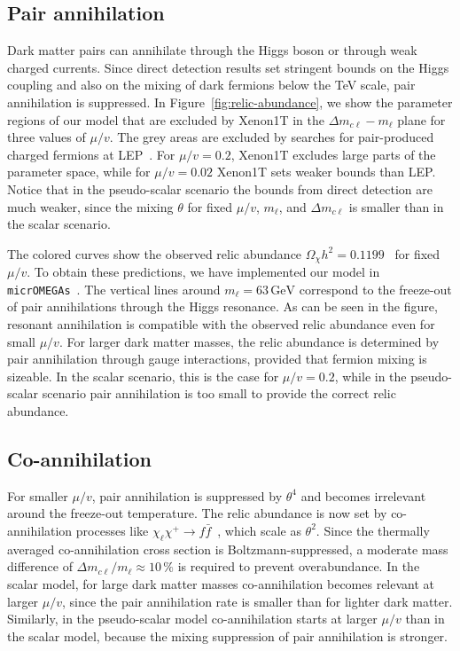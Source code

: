 \documentclass[nofootinbib,prd,aps,superscriptaddress,preprintnumbers]{revtex4}
\begin{document}
\subsection{Pair annihilation}\noindent Dark matter pairs can annihilate through the Higgs boson or through weak charged currents. Since direct detection results set stringent bounds on the Higgs coupling and also on the mixing of dark fermions below the TeV scale, pair annihilation is suppressed. In Figure~\ref{fig:relic-abundance}, we show the parameter regions of our model that are excluded by Xenon1T in the $\Delta m_{c\ell} - m_\ell$ plane for three values of $\mu/v$. The grey areas are excluded by searches for pair-produced charged fermions at LEP~\cite{Abdallah:2003xe}. For $\mu/v=0.2$, Xenon1T excludes large parts of the parameter space, while for $\mu/v=0.02$ Xenon1T sets weaker bounds than LEP. Notice that in the pseudo-scalar scenario the bounds from direct detection are much weaker, since the mixing $\theta$ for fixed $\mu/v$, $m_\ell$, and $\Delta m_{c\ell}$ is smaller than in the scalar scenario.

The colored curves show the observed relic abundance $\Omega_\chi h^2 = 0.1199$~\cite{Ade:2015xua} for fixed $\mu/v$. To obtain these predictions, we have implemented our model in \texttt{micrOMEGAs}~\cite{Belanger:2018mqt}. The vertical lines around $m_\ell = 63\,\text{GeV}$ correspond to the freeze-out of pair annihilations through the Higgs resonance. As can be seen in the figure, resonant annihilation is compatible with the observed relic abundance even for small $\mu/v$. For larger dark matter masses, the relic abundance is determined by pair annihilation through gauge interactions, provided that fermion mixing is sizeable. In the scalar scenario, this is the case for $\mu/v=0.2$, while in the pseudo-scalar scenario pair annihilation is too small to provide the correct relic abundance.

\subsection{Co-annihilation}\noindent For smaller $\mu/v$, pair annihilation is suppressed by $\theta^4$ and becomes irrelevant around the freeze-out temperature. The relic abundance is now set by co-annihilation processes like $\chi_\ell \chi^+ \to f\bar{f}$~\cite{Edsjo:1997bg}, which scale as $\theta^2$. Since the thermally averaged co-annihilation cross section is Boltzmann-suppressed, a moderate mass difference of $\Delta m_{c\ell}/m_\ell \approx 10\,\%$ is required to prevent overabundance. In the scalar model, for large dark matter masses co-annihilation becomes relevant at larger $\mu/v$, since the pair annihilation rate is smaller than for lighter dark matter. Similarly, in the pseudo-scalar model co-annihilation starts at larger $\mu/v$ than in the scalar model, because the mixing suppression of pair annihilation is stronger.
\end{document}
